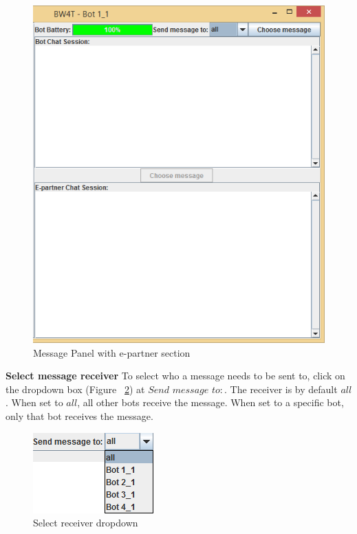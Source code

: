 \begin{figure}[h]
\begin{center}
\includegraphics{NewFeatures/hpg-right-epartner.png}
\end{center}
\caption{Message Panel with e-partner section}
\label{fig:mp2}
\end{figure}

\textbf{Select message receiver}
To select who a message needs to be sent to, click on the dropdown box (Figure ~\ref{fig:receiverDropDown}) at $Send$ $message$ $to:$. The receiver is by default $all$.
When set to $all$, all other bots receive the message. When set to a specific bot, only that bot receives the message.
\\
\begin{figure}[h]
\begin{center}
\includegraphics{NewFeatures/hpg-bot-receiver.png}
\end{center}
\caption{Select receiver dropdown}
\label{fig:receiverDropDown}
\end{figure}

